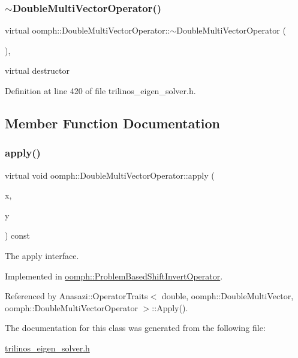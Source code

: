 \subsubsection{\texorpdfstring{$\sim$\+Double\+Multi\+Vector\+Operator()}{~DoubleMultiVectorOperator()}}
{\footnotesize\ttfamily virtual oomph\+::\+Double\+Multi\+Vector\+Operator\+::$\sim$\+Double\+Multi\+Vector\+Operator (\begin{DoxyParamCaption}{ }\end{DoxyParamCaption})\hspace{0.3cm}{\ttfamily [inline]}, {\ttfamily [virtual]}}



virtual destructor 



Definition at line 420 of file trilinos\+\_\+eigen\+\_\+solver.\+h.



\subsection{Member Function Documentation}
\mbox{\label{classoomph_1_1DoubleMultiVectorOperator_a58ada02505907b7b51e336ee1d79031c}} 
\subsubsection{\texorpdfstring{apply()}{apply()}}
{\footnotesize\ttfamily virtual void oomph\+::\+Double\+Multi\+Vector\+Operator\+::apply (\begin{DoxyParamCaption}\item[{const \hyperlink{classoomph_1_1DoubleMultiVector}{Double\+Multi\+Vector} \&}]{x,  }\item[{\hyperlink{classoomph_1_1DoubleMultiVector}{Double\+Multi\+Vector} \&}]{y }\end{DoxyParamCaption}) const\hspace{0.3cm}{\ttfamily [pure virtual]}}



The apply interface. 



Implemented in \hyperlink{classoomph_1_1ProblemBasedShiftInvertOperator_a1f209382d6023466da7e978ce16f1c09}{oomph\+::\+Problem\+Based\+Shift\+Invert\+Operator}.



Referenced by Anasazi\+::\+Operator\+Traits$<$ double, oomph\+::\+Double\+Multi\+Vector, oomph\+::\+Double\+Multi\+Vector\+Operator $>$\+::\+Apply().



The documentation for this class was generated from the following file\+:\begin{DoxyCompactItemize}
\item 
\hyperlink{trilinos__eigen__solver_8h}{trilinos\+\_\+eigen\+\_\+solver.\+h}\end{DoxyCompactItemize}
